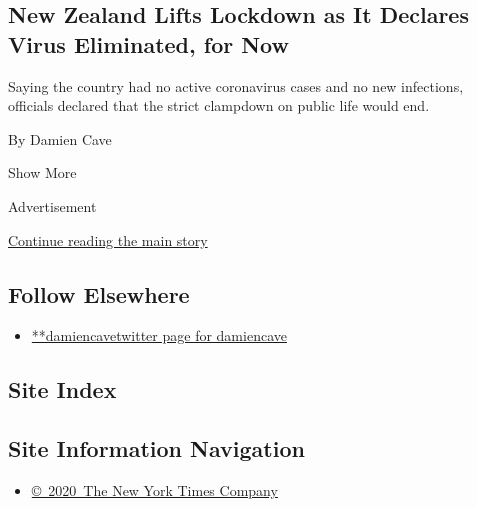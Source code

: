 \begin{enumerate}
  \hypertarget{new-zealand-lifts-lockdown-as-it-declares-virus-eliminated-for-now}{%
  \subsection{New Zealand Lifts Lockdown as It Declares Virus
  Eliminated, for
  Now}\label{new-zealand-lifts-lockdown-as-it-declares-virus-eliminated-for-now}}

  Saying the country had no active coronavirus cases and no new
  infections, officials declared that the strict clampdown on public
  life would end.

  By Damien Cave
\end{enumerate}

Show More

Advertisement

\protect\hyperlink{after-mid2}{Continue reading the main story}

\hypertarget{follow-elsewhere}{%
\subsection{Follow Elsewhere}\label{follow-elsewhere}}

\begin{itemize}
\tightlist
\item
  \href{https://twitter.com/damiencave}{**damiencavetwitter page for
  damiencave}
\end{itemize}

\hypertarget{site-index}{%
\subsection{Site Index}\label{site-index}}

\hypertarget{site-information-navigation}{%
\subsection{Site Information
Navigation}\label{site-information-navigation}}

\begin{itemize}
\tightlist
\item
  \href{https://help.nytimes3xbfgragh.onion/hc/en-us/articles/115014792127-Copyright-notice}{©~2020~The
  New York Times Company}
\end{itemize}

